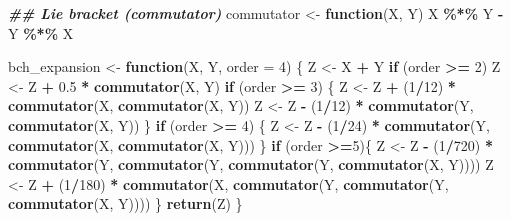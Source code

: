 \documentclass[
]{book}
\newenvironment{Shaded}{\begin{snugshade}}{\end{snugshade}}
\newcommand{\AttributeTok}[1]{\textcolor[rgb]{0.13,0.29,0.53}{#1}}
\newcommand{\ControlFlowTok}[1]{\textcolor[rgb]{0.13,0.29,0.53}{\textbf{#1}}}
\newcommand{\DecValTok}[1]{\textcolor[rgb]{0.00,0.00,0.81}{#1}}
\newcommand{\DocumentationTok}[1]{\textcolor[rgb]{0.56,0.35,0.01}{\textbf{\textit{#1}}}}
\newcommand{\FloatTok}[1]{\textcolor[rgb]{0.00,0.00,0.81}{#1}}
\newcommand{\FunctionTok}[1]{\textcolor[rgb]{0.13,0.29,0.53}{\textbf{#1}}}
\newcommand{\NormalTok}[1]{#1}
\newcommand{\OtherTok}[1]{\textcolor[rgb]{0.56,0.35,0.01}{#1}}
\newcommand{\SpecialCharTok}[1]{\textcolor[rgb]{0.81,0.36,0.00}{\textbf{#1}}}
\theoremstyle{definition}
\theoremstyle{definition}
\theoremstyle{definition}
\theoremstyle{definition}
\theoremstyle{remark}
\begin{document}
\begin{Shaded}
\begin{Highlighting}[]
\DocumentationTok{\#\# Lie bracket (commutator)}
\NormalTok{commutator }\OtherTok{\textless{}{-}} \ControlFlowTok{function}\NormalTok{(X, Y) X }\SpecialCharTok{\%*\%}\NormalTok{ Y }\SpecialCharTok{{-}}\NormalTok{ Y }\SpecialCharTok{\%*\%}\NormalTok{ X}

\NormalTok{bch\_expansion }\OtherTok{\textless{}{-}} \ControlFlowTok{function}\NormalTok{(X, Y, }\AttributeTok{order =} \DecValTok{4}\NormalTok{) \{}
\NormalTok{  Z }\OtherTok{\textless{}{-}}\NormalTok{ X }\SpecialCharTok{+}\NormalTok{ Y}
  \ControlFlowTok{if}\NormalTok{ (order }\SpecialCharTok{\textgreater{}=} \DecValTok{2}\NormalTok{) Z }\OtherTok{\textless{}{-}}\NormalTok{ Z }\SpecialCharTok{+} \FloatTok{0.5} \SpecialCharTok{*} \FunctionTok{commutator}\NormalTok{(X, Y)}
  \ControlFlowTok{if}\NormalTok{ (order }\SpecialCharTok{\textgreater{}=} \DecValTok{3}\NormalTok{) \{}
\NormalTok{    Z }\OtherTok{\textless{}{-}}\NormalTok{ Z }\SpecialCharTok{+}\NormalTok{ (}\DecValTok{1}\SpecialCharTok{/}\DecValTok{12}\NormalTok{) }\SpecialCharTok{*} \FunctionTok{commutator}\NormalTok{(X, }\FunctionTok{commutator}\NormalTok{(X, Y))}
\NormalTok{    Z }\OtherTok{\textless{}{-}}\NormalTok{ Z }\SpecialCharTok{{-}}\NormalTok{ (}\DecValTok{1}\SpecialCharTok{/}\DecValTok{12}\NormalTok{) }\SpecialCharTok{*} \FunctionTok{commutator}\NormalTok{(Y, }\FunctionTok{commutator}\NormalTok{(X, Y))}
\NormalTok{  \}}
  \ControlFlowTok{if}\NormalTok{ (order }\SpecialCharTok{\textgreater{}=} \DecValTok{4}\NormalTok{) \{}
\NormalTok{    Z }\OtherTok{\textless{}{-}}\NormalTok{ Z }\SpecialCharTok{{-}}\NormalTok{ (}\DecValTok{1}\SpecialCharTok{/}\DecValTok{24}\NormalTok{) }\SpecialCharTok{*} \FunctionTok{commutator}\NormalTok{(Y, }\FunctionTok{commutator}\NormalTok{(X, }\FunctionTok{commutator}\NormalTok{(X, Y)))}
\NormalTok{  \}}
  \ControlFlowTok{if}\NormalTok{ (order }\SpecialCharTok{\textgreater{}=}\DecValTok{5}\NormalTok{)\{}
\NormalTok{    Z }\OtherTok{\textless{}{-}}\NormalTok{ Z }\SpecialCharTok{{-}}\NormalTok{ (}\DecValTok{1}\SpecialCharTok{/}\DecValTok{720}\NormalTok{) }\SpecialCharTok{*} \FunctionTok{commutator}\NormalTok{(Y, }\FunctionTok{commutator}\NormalTok{(Y, }\FunctionTok{commutator}\NormalTok{(Y, }\FunctionTok{commutator}\NormalTok{(X, Y))))}
\NormalTok{    Z }\OtherTok{\textless{}{-}}\NormalTok{ Z }\SpecialCharTok{+}\NormalTok{ (}\DecValTok{1}\SpecialCharTok{/}\DecValTok{180}\NormalTok{) }\SpecialCharTok{*} \FunctionTok{commutator}\NormalTok{(X, }\FunctionTok{commutator}\NormalTok{(Y, }\FunctionTok{commutator}\NormalTok{(Y, }\FunctionTok{commutator}\NormalTok{(X, Y))))}
\NormalTok{  \}}
\FunctionTok{return}\NormalTok{(Z)}
\NormalTok{\}}
\end{Highlighting}
\end{Shaded}
\end{document}
